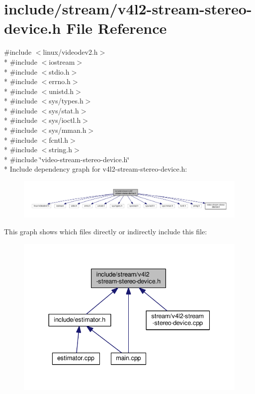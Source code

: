 \hypertarget{v4l2-stream-stereo-device_8h}{}\section{include/stream/v4l2-\/stream-\/stereo-\/device.h File Reference}
\label{v4l2-stream-stereo-device_8h}
{\ttfamily \#include $<$linux/videodev2.\+h$>$}\\*
{\ttfamily \#include $<$iostream$>$}\\*
{\ttfamily \#include $<$stdio.\+h$>$}\\*
{\ttfamily \#include $<$errno.\+h$>$}\\*
{\ttfamily \#include $<$unistd.\+h$>$}\\*
{\ttfamily \#include $<$sys/types.\+h$>$}\\*
{\ttfamily \#include $<$sys/stat.\+h$>$}\\*
{\ttfamily \#include $<$sys/ioctl.\+h$>$}\\*
{\ttfamily \#include $<$sys/mman.\+h$>$}\\*
{\ttfamily \#include $<$fcntl.\+h$>$}\\*
{\ttfamily \#include $<$string.\+h$>$}\\*
{\ttfamily \#include \char`\"{}video-\/stream-\/stereo-\/device.\+h\char`\"{}}\\*
Include dependency graph for v4l2-\/stream-\/stereo-\/device.h\+:
\nopagebreak
\begin{figure}[H]
\begin{center}
\leavevmode
\includegraphics[width=350pt]{v4l2-stream-stereo-device_8h__incl}
\end{center}
\end{figure}
This graph shows which files directly or indirectly include this file\+:
\nopagebreak
\begin{figure}[H]
\begin{center}
\leavevmode
\includegraphics[width=337pt]{v4l2-stream-stereo-device_8h__dep__incl}
\end{center}
\end{figure}
